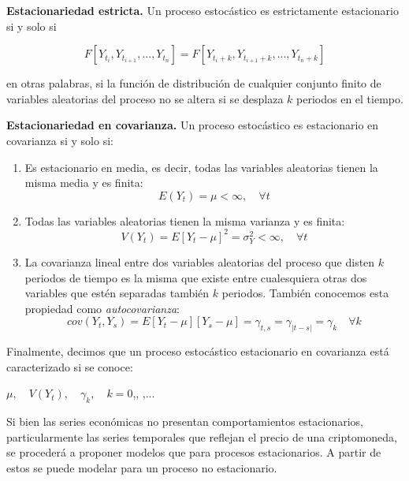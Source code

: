 \documentclass[a4paper,10pt]{article}
\begin{document}
\textbf{Estacionariedad estricta.} Un proceso estocástico es estrictamente estacionario si y solo si

\begin{equation}
F[Y_{t_i}, Y_{t_{i+1}},...,Y_{t_n}] = F[Y_{t_i+k}, Y_{t_{i+1}+k},...,Y_{t_n+k}]
\end{equation}

en otras palabras, si la función de distribución de cualquier conjunto finito de variables aleatorias del proceso no se altera si se desplaza $k$ periodos en el tiempo.

\textbf{Estacionariedad en covarianza.} Un proceso estocástico es estacionario en covarianza si y solo si:

\begin{enumerate}
 \item Es estacionario en media, es decir, todas las variables aleatorias tienen la misma media y es finita:
 \begin{equation}
  E(Y_t) = \mu < \infty, \quad \forall t
 \end{equation}

 \item Todas las variables aleatorias tienen la misma varianza y es finita:
 \begin{equation}\label{eqn:varianza}
  V(Y_t) = E[Y_t - \mu]^2 = \sigma_Y^2 < \infty, \quad \forall t
 \end{equation}

 \item La covarianza lineal entre dos variables aleatorias del proceso que disten $k$ periodos de tiempo es la misma que existe entre cualesquiera otras dos variables que estén separadas también $k$ periodos. También conocemos esta propiedad como \textit{autocovarianza}:
 \begin{equation}\label{eqn:covarianza}
  cov(Y_t,Y_s) = E[Y_t - \mu][Y_s - \mu] = \gamma_{t,s} = \gamma_{|t-s|} = \gamma_k \quad \forall k
 \end{equation}

\end{enumerate}

Finalmente, decimos que un proceso estocástico estacionario en covarianza está caracterizado si se conoce:

\begin{center}
$\mu, \quad V(Y_t), \quad \gamma_k, \quad k=0$,, ,...
\end{center}

Si bien las series económicas no presentan comportamientos estacionarios, particularmente las series temporales que reflejan el precio de una criptomoneda, se procederá a proponer modelos que para procesos estacionarios. A partir de estos se puede modelar para un proceso no estacionario.
\end{document}
